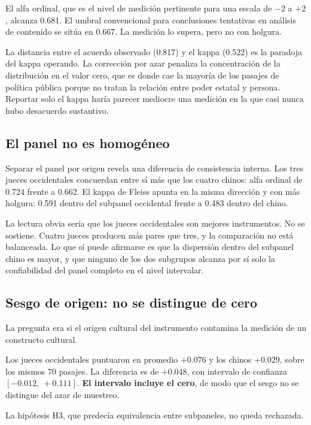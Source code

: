 El alfa ordinal, que es el nivel de medición pertinente para una escala de $-2$ a $+2$, alcanza 0.681. El umbral convencional para conclusiones tentativas en análisis de contenido se sitúa en 0.667. La medición lo supera, pero no con holgura.

La distancia entre el acuerdo observado (0.817) y el kappa (0.522) es la paradoja del kappa operando. La corrección por azar penaliza la concentración de la distribución en el valor cero, que es donde cae la mayoría de los pasajes de política pública porque no tratan la relación entre poder estatal y persona. Reportar solo el kappa haría parecer mediocre una medición en la que casi nunca hubo desacuerdo sustantivo.

\subsection{El panel no es homogéneo}

Separar el panel por origen revela una diferencia de consistencia interna. Los tres jueces occidentales concuerdan entre sí más que los cuatro chinos: alfa ordinal de 0.724 frente a 0.662. El kappa de Fleiss apunta en la misma dirección y con más holgura: 0.591 dentro del subpanel occidental frente a 0.483 dentro del chino.

La lectura obvia sería que los jueces occidentales son mejores instrumentos. No se sostiene. Cuatro jueces producen más pares que tres, y la comparación no está balanceada. Lo que sí puede afirmarse es que la dispersión dentro del subpanel chino es mayor, y que ninguno de los dos subgrupos alcanza por sí solo la confiabilidad del panel completo en el nivel intervalar.

\subsection{Sesgo de origen: no se distingue de cero}

La pregunta era si el origen cultural del instrumento contamina la medición de un constructo cultural.

Los jueces occidentales puntuaron en promedio $+0.076$ y los chinos $+0.029$, sobre los mismos 70 pasajes. La diferencia es de $+0.048$, con intervalo de confianza $[-0.012,\ +0.111]$. \textbf{El intervalo incluye el cero}, de modo que el sesgo no se distingue del azar de muestreo.

La hipótesis H3, que predecía equivalencia entre subpaneles, no queda rechazada.

